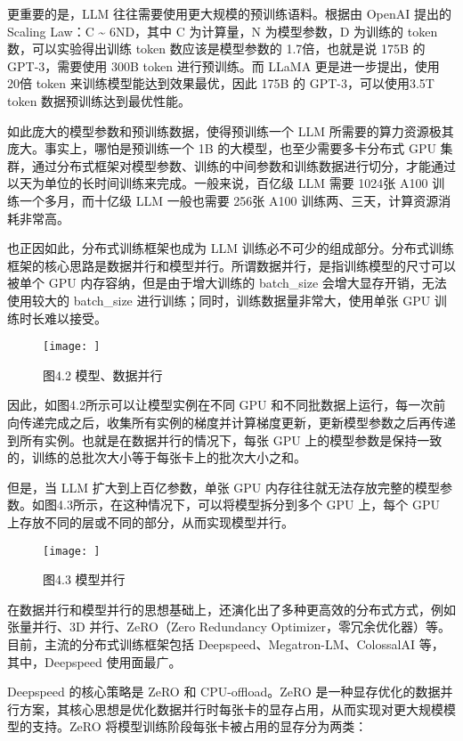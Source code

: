 \documentclass[
]{article}
\begin{document}
更重要的是，LLM 往往需要使用更大规模的预训练语料。根据由 OpenAI 提出的
Scaling Law：C \textasciitilde{} 6ND，其中 C 为计算量，N 为模型参数，D
为训练的 token 数，可以实验得出训练 token 数应该是模型参数的
1.7倍，也就是说 175B 的 GPT-3，需要使用 300B token 进行预训练。而 LLaMA
更是进一步提出，使用 20倍 token 来训练模型能达到效果最优，因此 175B 的
GPT-3，可以使用3.5T token 数据预训练达到最优性能。

如此庞大的模型参数和预训练数据，使得预训练一个 LLM
所需要的算力资源极其庞大。事实上，哪怕是预训练一个 1B
的大模型，也至少需要多卡分布式 GPU
集群，通过分布式框架对模型参数、训练的中间参数和训练数据进行切分，才能通过以天为单位的长时间训练来完成。一般来说，百亿级
LLM 需要 1024张 A100 训练一个多月，而十亿级 LLM 一般也需要 256张 A100
训练两、三天，计算资源消耗非常高。

也正因如此，分布式训练框架也成为 LLM
训练必不可少的组成部分。分布式训练框架的核心思路是数据并行和模型并行。所谓数据并行，是指训练模型的尺寸可以被单个
GPU 内存容纳，但是由于增大训练的 batch\_size
会增大显存开销，无法使用较大的 batch\_size
进行训练；同时，训练数据量非常大，使用单张 GPU 训练时长难以接受。

\begin{figure}[htbp]\centering
\texttt{[image: ]}
\caption{图4.2 模型、数据并行}
\end{figure}

因此，如图4.2所示可以让模型实例在不同 GPU
和不同批数据上运行，每一次前向传递完成之后，收集所有实例的梯度并计算梯度更新，更新模型参数之后再传递到所有实例。也就是在数据并行的情况下，每张
GPU
上的模型参数是保持一致的，训练的总批次大小等于每张卡上的批次大小之和。

但是，当 LLM 扩大到上百亿参数，单张 GPU
内存往往就无法存放完整的模型参数。如图4.3所示，在这种情况下，可以将模型拆分到多个
GPU 上，每个 GPU 上存放不同的层或不同的部分，从而实现模型并行。

\begin{figure}[htbp]\centering
\texttt{[image: ]}
\caption{图4.3 模型并行}
\end{figure}

在数据并行和模型并行的思想基础上，还演化出了多种更高效的分布式方式，例如张量并行、3D
并行、ZeRO（Zero Redundancy
Optimizer，零冗余优化器）等。目前，主流的分布式训练框架包括
Deepspeed、Megatron-LM、ColossalAI 等，其中，Deepspeed 使用面最广。

Deepspeed 的核心策略是 ZeRO 和 CPU-offload。ZeRO
是一种显存优化的数据并行方案，其核心思想是优化数据并行时每张卡的显存占用，从而实现对更大规模模型的支持。ZeRO
将模型训练阶段每张卡被占用的显存分为两类：
\end{document}
